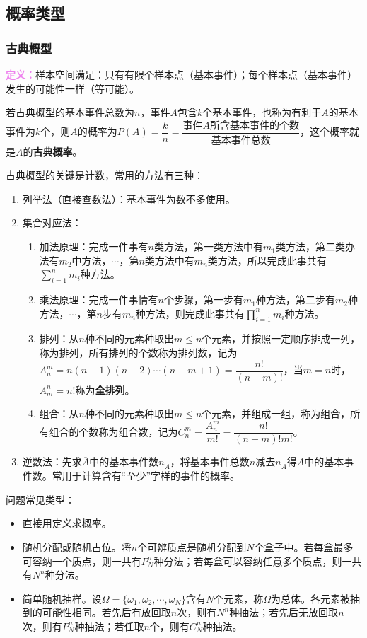 \subsection{概率类型}

\subsubsection{古典概型}

\textcolor{violet}{\textbf{定义：}}样本空间满足：只有有限个样本点（基本事件）；每个样本点（基本事件）发生的可能性一样（等可能）。

若古典概型的基本事件总数为$n$，事件$A$包含$k$个基本事件，也称为有利于$A$的基本事件为$k$个，则$A$的概率为$P(A)=\dfrac{k}{n}=\dfrac{\text{事件}A\text{所含基本事件的个数}}{\text{基本事件总数}}$，这个概率就是$A$的\textbf{古典概率}。

古典概型的关键是计数，常用的方法有三种：

\begin{enumerate}
    \item 列举法（直接查数法）：基本事件为数不多使用。
    \item 集合对应法：\begin{enumerate}
        \item 加法原理：完成一件事有$n$类方法，第一类方法中有$m_1$类方法，第二类办法有$m_2$中方法，$\cdots$，第$n$类方法中有$m_n$类方法，所以完成此事共有$\sum\limits_{i=1}^nm_i$种方法。 
        \item 乘法原理：完成一件事情有$n$个步骤，第一步有$m_1$种方法，第二步有$m_2$种方法，$\cdots$，第$n$步有$m_n$种方法，则完成此事共有$\prod\limits_{i=1}^nm_i$种方法。   
        \item 排列：从$n$种不同的元素种取出$m\leqslant n$个元素，并按照一定顺序排成一列，称为排列，所有排列的个数称为排列数，记为$A_n^m=n(n-1)(n-2)\cdots(n-m+1)=\dfrac{n!}{(n-m)!}$，当$m=n$时，$A_m^n=n!$称为\textbf{全排列}。
        \item 组合：从$n$种不同的元素种取出$m\leqslant n$个元素，并组成一组，称为组合，所有组合的个数称为组合数，记为$C_n^m=\dfrac{A_n^m}{m!}=\dfrac{n!}{(n-m)!m!}$。
    \end{enumerate}
    \item 逆数法：先求$\overline{A}$中的基本事件数$n_{\overline{A}}$，将基本事件总数$n$减去$n_{\overline{A}}$得$A$中的基本事件数。常用于计算含有“至少”字样的事件的概率。
\end{enumerate}

问题常见类型：

\begin{itemize}
    \item 直接用定义求概率。
    \item 随机分配或随机占位。将$n$个可辨质点是随机分配到$N$个盒子中。若每盒最多可容纳一个质点，则一共有$P_N^n$种分法；若每盒可以容纳任意多个质点，则一共有$N^n$种分法。
    \item 简单随机抽样。设$\Omega=\{\omega_1,\omega_2,\cdots,\omega_N\}$含有$N$个元素，称$\Omega$为总体。各元素被抽到的可能性相同。若先后有放回取$n$次，则有$N^n$种抽法；若先后无放回取$n$次，则有$P_N^n$种抽法；若任取$n$个，则有$C_N^n$种抽法。
\end{itemize}

